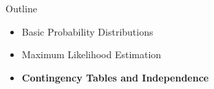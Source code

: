 \documentclass[aspectratio=169]{beamer}
\begin{document}




\begin{frame}{Outline}
  \begin{itemize}
    \item Basic Probability Distributions
    \item Maximum Likelihood Estimation
    \item \textbf{Contingency Tables and Independence}
  \end{itemize}
\end{frame}
\end{document}
